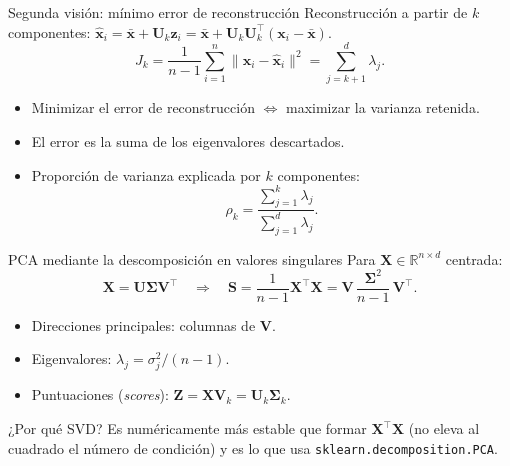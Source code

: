 \documentclass[aspectratio=169,11pt]{beamer}
\newcommand{\R}{\mathbb{R}}
\newcommand{\x}{\bm{x}}
\newcommand{\z}{\bm{z}}
\newcommand{\X}{\mathbf{X}}
\newcommand{\Sm}{\mathbf{S}}
\begin{document}
\begin{frame}{Segunda visión: mínimo error de reconstrucción}
  Reconstrucción a partir de $k$ componentes:
  $\hat{\x}_i = \bar{\x} + \mathbf{U}_k\z_i = \bar{\x} + \mathbf{U}_k\mathbf{U}_k^\top(\x_i-\bar{\x})$.
  \[
    J_k = \frac{1}{n-1}\sum_{i=1}^n \lVert \x_i - \hat{\x}_i \rVert^2
        = \sum_{j=k+1}^{d} \lambda_j .
  \]
  \begin{itemize}
    \item Minimizar el error de reconstrucción $\Leftrightarrow$ maximizar la varianza retenida.
    \item El error es la suma de los eigenvalores \alert{descartados}.
    \item Proporción de varianza explicada por $k$ componentes:
          \[
            \rho_k = \frac{\sum_{j=1}^{k}\lambda_j}{\sum_{j=1}^{d}\lambda_j}.
          \]
  \end{itemize}
\end{frame}

\begin{frame}{PCA mediante la descomposición en valores singulares}
  Para $\X \in \R^{n\times d}$ centrada:
  \[
    \X = \mathbf{U}\boldsymbol{\Sigma}\mathbf{V}^\top
    \quad\Longrightarrow\quad
    \Sm = \frac{1}{n-1}\X^\top\X = \mathbf{V}\,\frac{\boldsymbol{\Sigma}^2}{n-1}\,\mathbf{V}^\top .
  \]
  \begin{itemize}
    \item Direcciones principales: columnas de $\mathbf{V}$.
    \item Eigenvalores: $\lambda_j = \sigma_j^2/(n-1)$.
    \item Puntuaciones (\emph{scores}): $\mathbf{Z} = \X\mathbf{V}_k = \mathbf{U}_k\boldsymbol{\Sigma}_k$.
  \end{itemize}
  \begin{alertblock}{¿Por qué SVD?}
    Es numéricamente más estable que formar $\X^\top\X$ (no eleva al cuadrado el número
    de condición) y es lo que usa \texttt{sklearn.decomposition.PCA}.
  \end{alertblock}
\end{frame}
\end{document}
